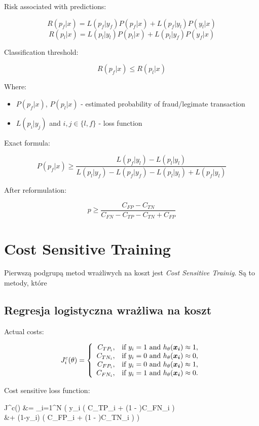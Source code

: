 \documentclass{book}
\begin{document}
	Risk associated with predictions:
	
	$$ R(p_f|x) = L(p_f|y_f)P(p_f|x) + L(p_f|y_l)P(y_l|x) $$
	$$ R(p_l|x) = L(p_l|y_l)P(p_l|x) + L(p_l|y_f)P(y_f|x) $$
	
	Classification threshold:
	
	$$ R(p_f|x) \leq R(p_l|x)$$
	
	Where:
	
	\begin{itemize}
		\item $P(p_f|x)$, $P(p_l|x)$ - estimated probability of fraud/legimate transaction
		\item $L(p_{i}|y_{j})$ and $i,j \in \{l,f\}$ - loss function
	\end{itemize}{}
	Exact formula:
	
	$$ P(p_f|x) \ge \frac{L(p_f|y_l) - L(p_l|y_l)}{L(p_l|y_f) - L(p_f|y_f) - L(p_l|y_l) + L(p_f|y_l)}$$
	
	After reformulation:
	
	$$ p \ge \frac{C_{FP} - C_{TN}}{C_{FN} - C_{TP} - C_{TN} + C_{FP}}$$

	\section{Cost Sensitive Training}
	
		Pierwszą podgrupą metod wrażliwych na koszt jest \textit{Cost Sensitive Trainig}. Są to metody, które 
	
	\subsection{Regresja logistyczna wrażliwa na koszt}
	
	    Actual costs:
	
		$$
		J^c_i(\theta)=\left\{
		\begin{array}{rl}
		C_{TP_i}, &\mbox{if $y_i = 1$ and $h_{\theta}(\boldsymbol{x_i}) \approx 1$}, \\
		C_{TN_i}, &\mbox{if $y_i = 0$ and $h_{\theta}(\boldsymbol{x_i}) \approx 0$}, \\
		C_{FP_i}, &\mbox{if $y_i = 0$ and $h_{\theta}(\boldsymbol{x_i}) \approx 1$}, \\
		C_{FN_i}, &\mbox{if $y_i = 1$ and $h_{\theta}(\boldsymbol{x_i}) \approx 0$}.
		\end{array}
		\right.
		$$
		
		Cost sensitive loss function:
		\begin{talign*}
			J^c(\theta) &=  \sum_{i=1}^{N} \bigg( y_i \Big( \htx C_{TP_i} + (1 - \htx)C_{FN_i} \Big) \\
			&+ (1-y_i) \Big( \htx C_{FP_i} + (1 - \htx)C_{TN_i} \Big) \bigg)
		\end{talign*}
	
\end{document}
